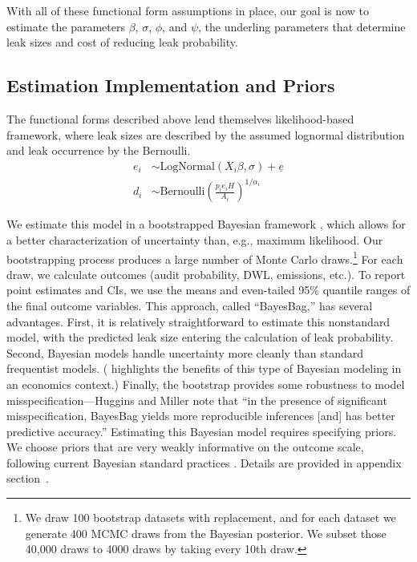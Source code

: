 With all of these functional form assumptions in place, our goal is now to estimate the parameters \(\beta\), \(\sigma\), \(\phi\), and \(\psi\), the underling parameters that determine leak sizes and cost of reducing leak probability.

\subsection{Estimation Implementation and Priors}
\label{sec:estimation-implementation-and-priors}

The functional forms described above lend themselves likelihood-based framework, where leak sizes are described by the assumed lognormal distribution and leak occurrence by the Bernoulli.
\begin{align*}
e_i &\sim \text{LogNormal}(X_i \beta, \sigma) + \underline{e} \\
d_i &\sim \text{Bernoulli} \left(\frac{p_i e_i H}{A_i}\right) ^{1 / \alpha_i}
\end{align*}

We estimate this model in a bootstrapped Bayesian framework \parencite{Huggins/Miller:2019}, which allows for a better characterization of uncertainty than, e.g., maximum likelihood.
Our bootstrapping process produces a large number of Monte Carlo draws.\footnote{%
We draw 100 bootstrap datasets with replacement, and for each dataset we generate 400 \gls{MCMC} draws from the Bayesian posterior.
We subset those 40,000 draws to 4000 draws by taking every 10th draw.
}
For each draw, we calculate outcomes (audit probability, \gls{DWL}, emissions, etc.).
To report point estimates and \glspl{CI}, we use the means and even-tailed 95\% quantile ranges of the final outcome variables.
This approach, called ``BayesBag,'' has several advantages.
First, it is relatively straightforward to estimate this nonstandard model, with the predicted leak size entering the calculation of leak probability.
Second, Bayesian models handle uncertainty more cleanly than standard frequentist models.
(\cite{Meager:2019} highlights the benefits of this type of Bayesian modeling in an economics context.)
Finally, the bootstrap provides some robustness to model misspecification---Huggins and Miller note that ``in the presence of significant misspecification, BayesBag yields more reproducible inferences [and] has better predictive accuracy.''
Estimating this Bayesian model requires specifying priors.
We choose priors that are very weakly informative on the outcome scale,
following current Bayesian standard practices \parencite{Gelman/etal:2020}.
Details are provided in appendix section~\iftoggle{usexr}{\ref{app:model-priors}}{A3.1}.



